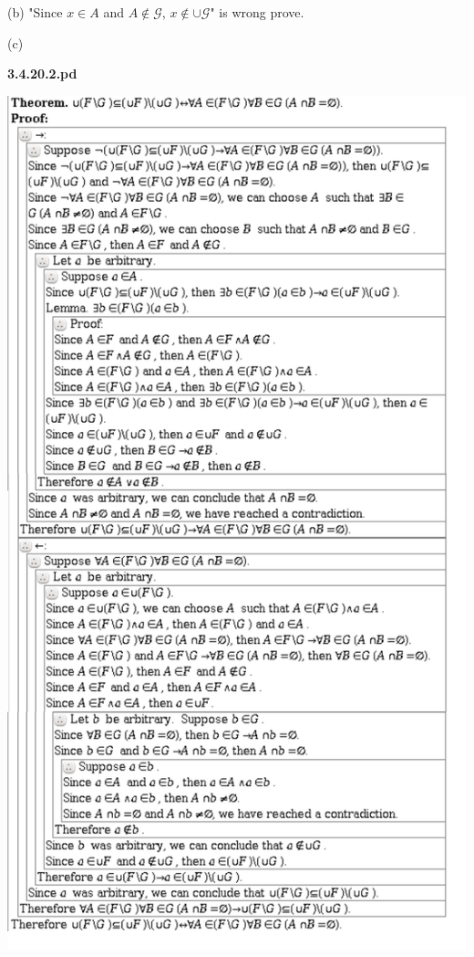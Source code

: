 \documentclass{article}
\begin{document}
\vspace{30pt}

(b) "Since $x \in A$ and $A \notin \mathcal{G}$, $x \notin \cup \mathcal{G}$" is wrong prove.

\vspace{30pt}

(c)

\textbf{3.4.20.2.pd}
\vspace{10pt}

\includegraphics[scale=0.15]{3_4_20_2}
\end{document}
